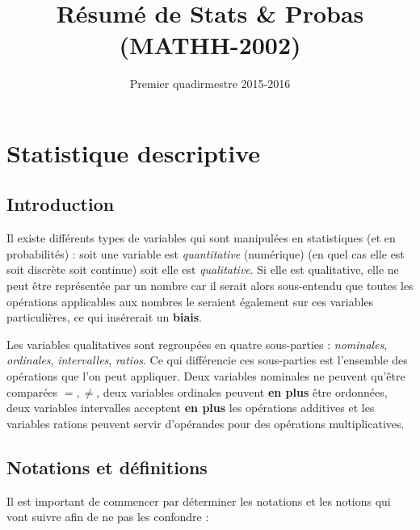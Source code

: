 \documentclass{article}
\title{Résumé de Stats \& Probas (MATHH-2002)}
\date{Premier quadirmestre 2015-2016}
\author{}
\begin{document}
\maketitle
\tableofcontents
\newpage
{}

\section{Statistique descriptive}
	\subsection{Introduction}
		Il existe différents types de variables qui sont manipulées en statistiques (et en probabilités) : soit une variable est \textit{quantitative} (numérique)
		(en quel cas elle est soit discrète soit continue) soit elle est \textit{qualitative}. Si elle est qualitative, elle ne peut être représentée par un nombre car il
		serait alors sous-entendu que toutes les opérations applicables aux nombres le seraient également sur ces variables particulières, ce qui insérerait un \textbf{biais}.

		Les variables qualitatives sont regroupées en quatre sous-parties : \textit{nominales}, \textit{ordinales}, \textit{intervalles}, \textit{ratios}. Ce qui différencie
		ces sous-parties est l'ensemble des opérations que l'on peut appliquer. Deux variables nominales ne peuvent qu'être comparées $=,\neq$, deux variables ordinales peuvent
		\textbf{en plus} être ordonnées, deux variables intervalles acceptent \textbf{en plus} les opérations additives et les variables rations peuvent servir d'opérandes
		pour des opérations multiplicatives.

	\subsection{Notations et définitions}
		Il est important de commencer par déterminer les notations et les notions qui vont suivre afin de ne pas les confondre :
\end{document}
